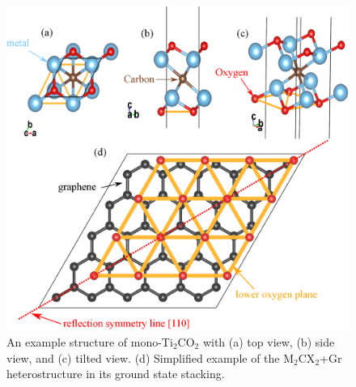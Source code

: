 \begin{figure}[htb]
\centering
\includegraphics[width=0.8\linewidth]{stacking.eps}%
\caption{An example structure of mono-Ti$_2$CO$_2$ with (a) top view, (b) side view, and (c) tilted view. (d)  Simplified example of the M$_2$CX$_2$+Gr heterostructure in its ground state stacking.  \label{Li_stacking}}
\end{figure}

